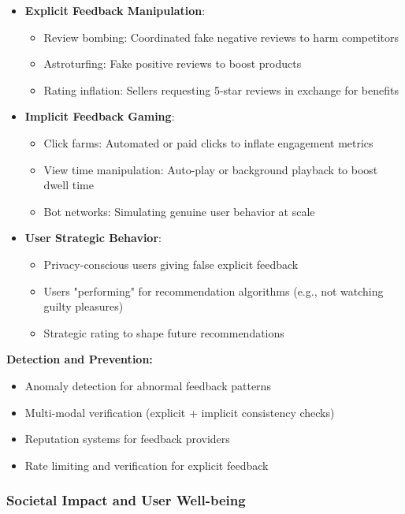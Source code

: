 \begin{itemize}
    \item \textbf{Explicit Feedback Manipulation}:
    \begin{itemize}
        \item Review bombing: Coordinated fake negative reviews to harm competitors
        \item Astroturfing: Fake positive reviews to boost products
        \item Rating inflation: Sellers requesting 5-star reviews in exchange for benefits
    \end{itemize}
    
    \item \textbf{Implicit Feedback Gaming}:
    \begin{itemize}
        \item Click farms: Automated or paid clicks to inflate engagement metrics
        \item View time manipulation: Auto-play or background playback to boost dwell time
        \item Bot networks: Simulating genuine user behavior at scale
    \end{itemize}
    
    \item \textbf{User Strategic Behavior}:
    \begin{itemize}
        \item Privacy-conscious users giving false explicit feedback
        \item Users "performing" for recommendation algorithms (e.g., not watching guilty pleasures)
        \item Strategic rating to shape future recommendations
    \end{itemize}
\end{itemize}

\textbf{Detection and Prevention:}
\begin{itemize}
    \item Anomaly detection for abnormal feedback patterns
    \item Multi-modal verification (explicit + implicit consistency checks)
    \item Reputation systems for feedback providers
    \item Rate limiting and verification for explicit feedback
\end{itemize}

\subsubsection{Societal Impact and User Well-being}


